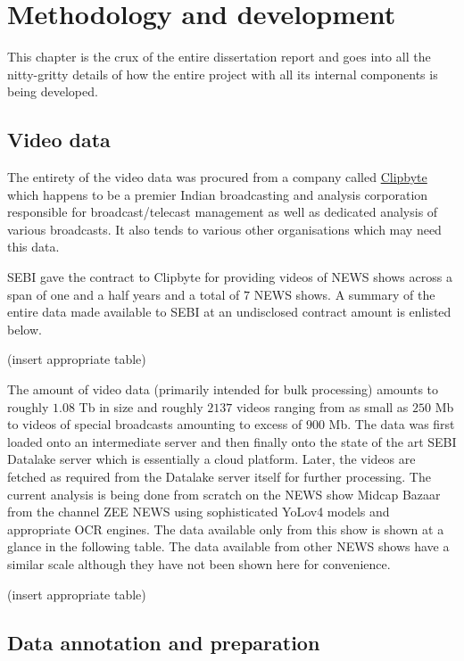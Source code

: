 \chapter{Methodology and development} \label{chapter3}

This chapter is the crux of the entire dissertation report and goes into all the nitty-gritty details of how the entire project with all its internal components is being developed.

\vspace{-0.1in}
\section{Video data} \label{vid_data}

The entirety of the video data was procured from a company called \href{clipbyte.com}{Clipbyte} which happens to be a premier Indian broadcasting and analysis corporation responsible for broadcast/telecast management as well as dedicated analysis of various broadcasts. It also tends to various other organisations which may need this data. \par

SEBI gave the contract to Clipbyte for providing videos of NEWS shows across a span of one and a half years and a total of $7$ NEWS shows. A summary of the entire data made available to SEBI at an undisclosed contract amount is enlisted below.

(insert appropriate table)

The amount of video data (primarily intended for bulk processing) amounts to roughly $1.08$ Tb in size and roughly $2137$ videos ranging from as small as $250$ Mb to videos of special broadcasts amounting to excess of $900$ Mb. The data was first loaded onto an intermediate server and then finally onto the state of the art SEBI Datalake server which is essentially a cloud platform. Later, the videos are fetched as required from the Datalake server itself for further processing. The current analysis is being done from scratch on the NEWS show Midcap Bazaar from the channel ZEE NEWS using sophisticated YoLov4 models and appropriate OCR engines. The data available only from this show is shown at a glance in the following table. The data available from other NEWS shows have a similar scale although they have not been shown here for convenience.

(insert appropriate table)

\section{Data annotation and preparation}

